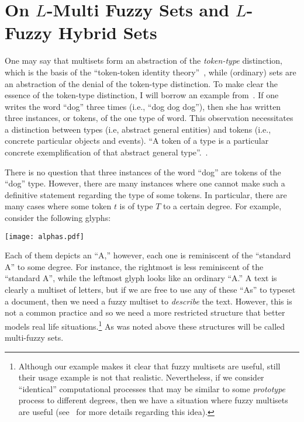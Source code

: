 \documentclass{amsart}
\theoremstyle{definition}
\begin{document}
\section{On $L$-Multi Fuzzy Sets and $L$-Fuzzy Hybrid Sets}
One may say that multisets form an abstraction of the {\em token-type}
distinction, which is the basis of the ``token-token identity 
theory''~\cite{searle04}, while (ordinary) sets are an abstraction of the 
denial of the token-type distinction. To make clear the essence of the 
token-type distinction, I will borrow an example from~\cite{searle04}. If 
one writes the word ``dog'' three times (i.e., ``dog dog dog''), then she 
has written three instances, or tokens, of the one type of word. This observation 
necessitates a distinction between types (i.e, abstract general entities) and tokens
(i.e., concrete particular objects and events). ``A token of a type is
a particular concrete exemplification of that abstract general 
type''.~\cite[page 59]{searle04}. 

There is no question that three instances of the word ``dog'' are tokens 
of the ``dog'' type. However, there are many instances where one cannot make
such a definitive statement regarding the type of some tokens. In particular,
there are many cases where some token $t$ is of type $T$ to a certain degree.
For example, consider the following glyphs:
\begin{center}
\texttt{[image: alphas.pdf]}
\end{center}
Each of them depicts an ``A,'' however, each one is reminiscent of the ``standard A'' to 
some degree. For instance, the rightmost is less reminiscent of the ``standard A'', while
the leftmost glyph looks like an ordinary ``A.'' A text is clearly a multiset of letters,
but if we are free to use any of these ``As'' to typeset a document, then we need a
fuzzy multiset to {\em describe} the text. However, this is not a common practice and
so we need a more restricted structure that better models real life 
situations.\footnote{Although our example makes it clear that fuzzy multisets are useful,
still their usage example is not that realistic. Nevertheless, if we consider ``identical'' 
computational processes that may be similar to some {\em prototype} process to different degrees, 
then we have a situation where fuzzy multisets are useful (see~\cite{syropoulos2009} for more details regarding this idea).} As was noted above these structures will be called multi-fuzzy sets. 
\end{document}
